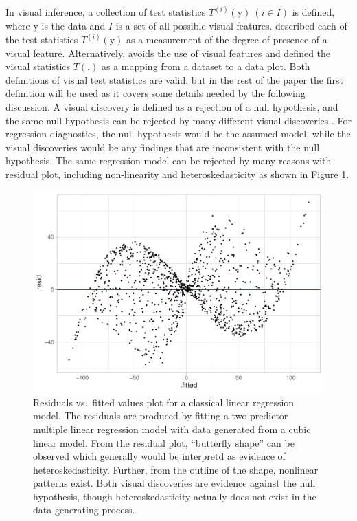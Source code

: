 \documentclass[]{interact}
\theoremstyle{plain}%
\theoremstyle{definition}
\theoremstyle{remark}
\begin{document}
In visual inference, a collection of test statistics
\(T^{(i)}(\boldsymbol{\mathrm{y}})~(i \in I)\) is defined, where
\(\boldsymbol{\mathrm{y}}\) is the data and \(I\) is a set of all
possible visual features. \citet{buja_statistical_2009} described each
of the test statistics \(T^{(i)}(\boldsymbol{\mathrm{y}})\) as a
measurement of the degree of presence of a visual feature.
Alternatively, \citet{majumder_validation_2013} avoids the use of visual
features and defined the visual statistics \(T(.)\) as a mapping from a
dataset to a data plot. Both definitions of visual test statistics are
valid, but in the rest of the paper the first definition will be used as
it covers some details needed by the following discussion. A visual
discovery is defined as a rejection of a null hypothesis, and the same
null hypothesis can be rejected by many different visual discoveries
\citep{buja_statistical_2009}. For regression diagnostics, the null
hypothesis would be the assumed model, while the visual discoveries
would be any findings that are inconsistent with the null hypothesis.
The same regression model can be rejected by many reasons with residual
plot, including non-linearity and heteroskedasticity as shown in Figure
\ref{fig:residual-plot-cubic-heter}.

\begin{figure}
\centering
\includegraphics{paper_comparison_files/figure-latex/residual-plot-cubic-heter-1.pdf}
\caption{Residuals vs.~fitted values plot for a classical linear
regression model. The residuals are produced by fitting a two-predictor
multiple linear regression model with data generated from a cubic linear
model. From the residual plot, ``butterfly shape'' can be observed which
generally would be interpretd as evidence of heteroskedasticity.
Further, from the outline of the shape, nonlinear patterns exist. Both
visual discoveries are evidence against the null hypothesis, though
heteroskedasticity actually does not exist in the data generating
process. \label{fig:residual-plot-cubic-heter}}
\end{figure}
\end{document}
